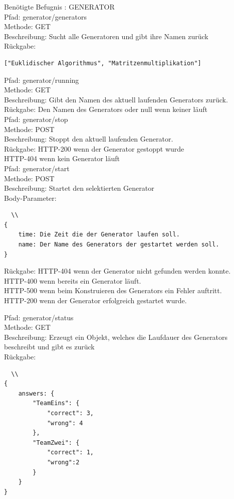 Benötigte Befugnis : GENERATOR \\

\noindent Pfad: generator/generators \\
Methode: GET \\
Beschreibung: Sucht alle Generatoren und gibt ihre Namen zurück \\
Rückgabe: \begin{lstlisting} 
["Euklidischer Algorithmus", "Matritzenmultiplikation"]
\end{lstlisting}

\noindent Pfad: generator/running \\
Methode: GET \\
Beschreibung: Gibt den Namen des aktuell laufenden Generators zurück.  \\
Rückgabe: Den Namen des Generators oder null wenn keiner läuft \\

\noindent Pfad: generator/stop \\
Methode: POST \\
Beschreibung: Stoppt den aktuell laufenden Generator.  \\
Rückgabe: HTTP-200 wenn der Generator gestoppt wurde\\
HTTP-404 wenn kein Generator läuft\\

\noindent Pfad: generator/start \\
Methode: POST \\
Beschreibung: Startet den selektierten Generator  \\
Body-Parameter:
\begin{lstlisting}  \\
{
	time: Die Zeit die der Generator laufen soll.
	name: Der Name des Generators der gestartet werden soll.
}
\end{lstlisting}
Rückgabe: HTTP-404 wenn der Generator nicht gefunden werden konnte. \\
HTTP-400 wenn bereits ein Generator läuft. \\
HTTP-500 wenn beim Konstruieren des Generators ein Fehler auftritt.\\
HTTP-200 wenn der Generator erfolgreich gestartet wurde.

\noindent Pfad: generator/status \\
Methode: GET \\
Beschreibung: Erzeugt ein Objekt, welches die Laufdauer des Generators beschreibt und gibt es zurück  \\
Rückgabe:
\begin{lstlisting}  \\
{
	answers: {
		"TeamEins": {
			"correct": 3,
			"wrong": 4
		},
		"TeamZwei": {
			"correct": 1,
			"wrong":2
		}
	}
}
\end{lstlisting}


